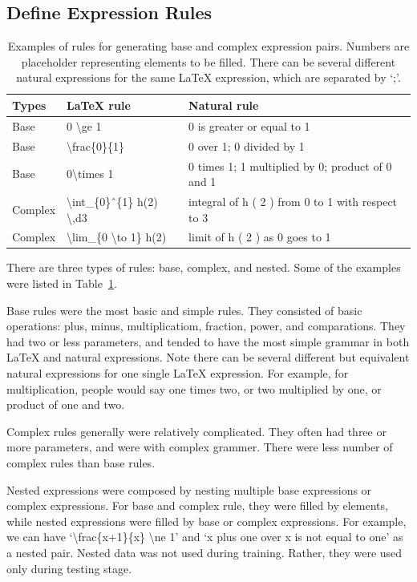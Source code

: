 \documentclass{article}
\begin{document}
\subsection{Define Expression Rules}
\begin{table}
  \caption{Examples of rules for generating base and complex expression pairs. Numbers are placeholder representing elements to be filled. There can be several different natural expressions for the same LaTeX expression, which are separated by `;'.}
  \label{rule}
  \centering
  \begin{tabular}{|p{1.5cm}||p{3.5cm}|p{7cm}|}
      \hline
      Types& LaTeX rule & Natural rule \\
      \hline
      \hline
      Base & 0 \textbackslash ge 1 & 0 is greater or equal to 1 \\
      \hline 
      Base& \textbackslash frac\{0\}\{1\} & 0 over 1; 0 divided by 1 \\
      \hline
      Base& 0\textbackslash times 1 & 0 times 1; 1 multiplied by 0; product of 0 and 1 \\
      \hline
      Complex& \textbackslash int\_\{0\}\^ \ \{1\} h(2) \textbackslash,d3 & integral of h ( 2 ) from 0 to 1 with respect to 3 \\
      \hline
      Complex& \textbackslash lim\_\{0 \textbackslash to 1\} h(2) & limit of h ( 2 ) as 0 goes to 1 \\
      \hline
  \end{tabular}
\end{table}
%
There are three types of rules: base, complex, and nested. Some of the examples were listed in Table~\ref{rule}. \par 
Base rules were the most basic and simple rules. They consisted of basic operations: plus, minus, multiplicatiom, fraction, power, and comparations. They had two or less parameters, and tended to have the most simple grammar in both LaTeX and natural expressions. Note there can be several different but equivalent natural expressions for one single LaTeX expression. For example, for multiplication, people would say one times two, or two multiplied by one, or product of one and two. \par 
Complex rules generally were relatively complicated. They often had three or more parameters, and were with complex grammer. There were less number of complex rules than base rules. \par 
Nested expressions were composed by nesting multiple base expressions or complex expressions. For base and complex rule, they were filled by elements, while nested expressions were filled by base or complex expressions. For example, we can have `\textbackslash frac\{x+1\}\{x\} \textbackslash ne 1' and `x plus one over x is not equal to one' as a nested pair. Nested data was not used during training. Rather, they were used only during testing stage. 
%
\end{document}

